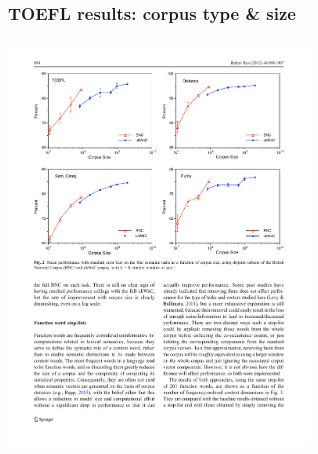 \documentclass[t]{beamer} %
\begin{document}
\begin{frame}
  \frametitle{TOEFL results: corpus type \& size}
  \framesubtitle{\citep[p.~894, Fig.~2]{Bullinaria:Levy:12}}

  \ungap[1]
  \begin{center}
    \includegraphics[width=8cm]{img/BullinariaLevy2012_p894_fig2_TOEFL_size}
  \end{center}

  \ungap[.5]
\end{frame}
\end{document}
